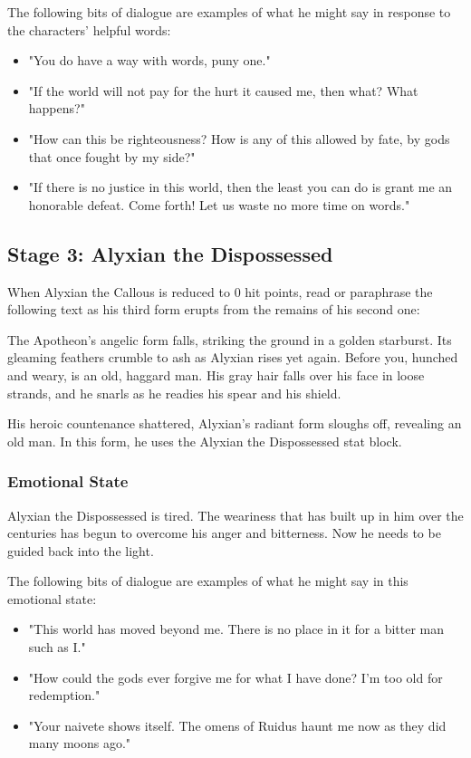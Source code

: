 \documentclass[10pt,a4paper,twoside,fancy,bg=print,twocolumn,openany,nodeprecatedcode]{dndbook}
\begin{document}
The following bits of dialogue are examples of what he might say in response to the characters' helpful words:


\begin{itemize}
\item "You do have a way with words, puny one."
\item "If the world will not pay for the hurt it caused me, then what? What happens?"
\item "How can this be righteousness? How is any of this allowed by fate, by gods that once fought by my side?"
\item "If there is no justice in this world, then the least you can do is grant me an honorable defeat. Come forth! Let us waste no more time on words."
\end{itemize}

\subsection{Stage 3: Alyxian the Dispossessed}
When Alyxian the Callous is reduced to 0 hit points, read or paraphrase the following text as his third form erupts from the remains of his second one:

\begin{DndReadAloud}{}
The Apotheon's angelic form falls, striking the ground in a golden starburst. Its gleaming feathers crumble to ash as Alyxian rises yet again. Before you, hunched and weary, is an old, haggard man. His gray hair falls over his face in loose strands, and he snarls as he readies his spear and his shield.

\end{DndReadAloud}

His heroic countenance shattered, Alyxian's radiant form sloughs off, revealing an old man. In this form, he uses the Alyxian the Dispossessed stat block.

\subsubsection{Emotional State}
Alyxian the Dispossessed is tired. The weariness that has built up in him over the centuries has begun to overcome his anger and bitterness. Now he needs to be guided back into the light.

The following bits of dialogue are examples of what he might say in this emotional state:


\begin{itemize}
\item "This world has moved beyond me. There is no place in it for a bitter man such as I."
\item "How could the gods ever forgive me for what I have done? I'm too old for redemption."
\item "Your naivete shows itself. The omens of Ruidus haunt me now as they did many moons ago."
\end{itemize}
\end{document}
